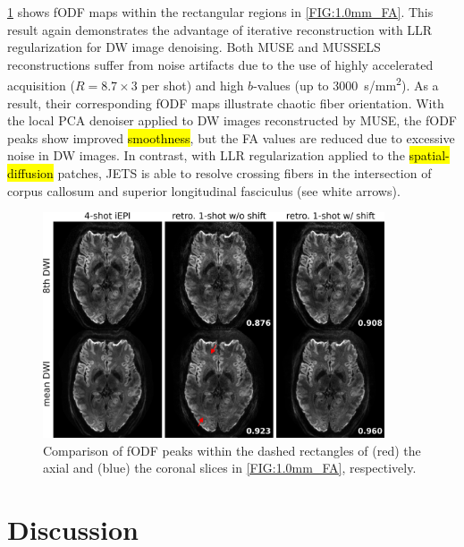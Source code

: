 \documentclass[preprint,12pt,authoryear,review]{elsarticle}
\begin{document}
    \cref{FIG:1.0mm_fODF} shows fODF maps
        within the rectangular regions in \cref{FIG:1.0mm_FA}.
        This result again demonstrates
        the advantage of iterative reconstruction with LLR regularization
        for DW image denoising.
        Both MUSE and MUSSELS reconstructions suffer from noise artifacts due to
        the use of highly accelerated acquisition ($R = 8.7 \times 3$ per shot)
        and high $b$-values (up to \SI{3000}{s/mm^2}).
        As a result, their corresponding fODF maps illustrate chaotic fiber orientation.
        With the local PCA denoiser applied to DW images reconstructed by MUSE,
        the fODF peaks show improved \hl{smoothness}, 
        but the FA values are reduced
        due to excessive noise in DW images.
        In contrast, with LLR regularization applied to
        the \hl{spatial-diffusion} patches, 
        JETS is able to resolve crossing fibers in the intersection of corpus callosum
        and superior longitudinal fasciculus (see white arrows).

    \begin{figure}
        \centering
        \includegraphics[width=0.9\textwidth]{../figures/fig5.png}
        \caption{Comparison of fODF peaks within the dashed rectangles
        of (red) the axial and (blue) the coronal slices in \cref{FIG:1.0mm_FA}, respectively.}
        \label{FIG:1.0mm_fODF}
    \end{figure}

    \clearpage

    \section{Discussion}
    \label{SEC:Disc}
\end{document}
